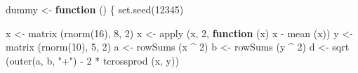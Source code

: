 \documentclass[
  12pt,
  letterpaper,
  DIV=11,
  numbers=noendperiod]{scrreprt}
\newenvironment{Shaded}{\begin{snugshade}}{\end{snugshade}}
\newcommand{\ControlFlowTok}[1]{\textcolor[rgb]{0.00,0.23,0.31}{\textbf{#1}}}
\newcommand{\DecValTok}[1]{\textcolor[rgb]{0.68,0.00,0.00}{#1}}
\newcommand{\FunctionTok}[1]{\textcolor[rgb]{0.28,0.35,0.67}{#1}}
\newcommand{\NormalTok}[1]{\textcolor[rgb]{0.00,0.23,0.31}{#1}}
\newcommand{\OtherTok}[1]{\textcolor[rgb]{0.00,0.23,0.31}{#1}}
\newcommand{\SpecialCharTok}[1]{\textcolor[rgb]{0.37,0.37,0.37}{#1}}
\newcommand{\StringTok}[1]{\textcolor[rgb]{0.13,0.47,0.30}{#1}}
\theoremstyle{remark}
\begin{document}
\begin{Shaded}
\begin{Highlighting}[]
\NormalTok{dummy }\OtherTok{\textless{}{-}} \ControlFlowTok{function}\NormalTok{ () \{}
  \FunctionTok{set.seed}\NormalTok{(}\DecValTok{12345}\NormalTok{)}
  
\NormalTok{  x }\OtherTok{\textless{}{-}} \FunctionTok{matrix}\NormalTok{ (}\FunctionTok{rnorm}\NormalTok{(}\DecValTok{16}\NormalTok{), }\DecValTok{8}\NormalTok{, }\DecValTok{2}\NormalTok{)}
\NormalTok{  x }\OtherTok{\textless{}{-}} \FunctionTok{apply}\NormalTok{ (x, }\DecValTok{2}\NormalTok{, }\ControlFlowTok{function}\NormalTok{ (x)}
\NormalTok{    x }\SpecialCharTok{{-}} \FunctionTok{mean}\NormalTok{ (x))}
\NormalTok{  y }\OtherTok{\textless{}{-}} \FunctionTok{matrix}\NormalTok{ (}\FunctionTok{rnorm}\NormalTok{(}\DecValTok{10}\NormalTok{), }\DecValTok{5}\NormalTok{, }\DecValTok{2}\NormalTok{)}
\NormalTok{  a }\OtherTok{\textless{}{-}} \FunctionTok{rowSums}\NormalTok{ (x }\SpecialCharTok{\^{}} \DecValTok{2}\NormalTok{)}
\NormalTok{  b }\OtherTok{\textless{}{-}} \FunctionTok{rowSums}\NormalTok{ (y }\SpecialCharTok{\^{}} \DecValTok{2}\NormalTok{)}
\NormalTok{  d }\OtherTok{\textless{}{-}} \FunctionTok{sqrt}\NormalTok{ (}\FunctionTok{outer}\NormalTok{(a, b, }\StringTok{"+"}\NormalTok{) }\SpecialCharTok{{-}} \DecValTok{2} \SpecialCharTok{*} \FunctionTok{tcrossprod}\NormalTok{ (x, y))}
  

\end{Highlighting}
\end{Shaded}
\end{document}
